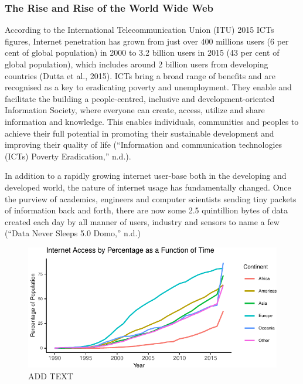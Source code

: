 \documentclass[11pt,]{article}
\begin{document}
\hypertarget{the-rise-and-rise-of-the-world-wide-web}{%
\subsubsection{The Rise and Rise of the World Wide
Web}\label{the-rise-and-rise-of-the-world-wide-web}}

According to the International Telecommunication Union (ITU) 2015 ICTs
figures, Internet penetration has grown from just over 400 millions
users (6 per cent of global population) in 2000 to 3.2 billion users in
2015 (43 per cent of global population), which includes around 2 billion
users from developing countries (Dutta et al., 2015). ICTs bring a broad
range of benefits and are recognised as a key to eradicating poverty and
unemployment. They enable and facilitate the building a people-centred,
inclusive and development-oriented Information Society, where everyone
can create, access, utilize and share information and knowledge. This
enables individuals, communities and peoples to achieve their full
potential in promoting their sustainable development and improving their
quality of life (``Information and communication technologies (ICTs)
\textbar{} Poverty Eradication,'' n.d.).

In addition to a rapidly growing internet user-base both in the
developing and developed world, the nature of internet usage has
fundamentally changed. Once the purview of academics, engineers and
computer scientists sending tiny packets of information back and forth,
there are now some 2.5 quintillion bytes of data created each day by all
manner of users, industry and sensors to name a few (``Data Never Sleeps
5.0 \textbar{} Domo,'' n.d.)

\begin{figure}[H]

{\centering \includegraphics{MD_Final_files/figure-latex/internetAccessPlot-1} 

}

\caption{ADD TEXT}\label{fig:internetAccessPlot}
\end{figure}
\end{document}
